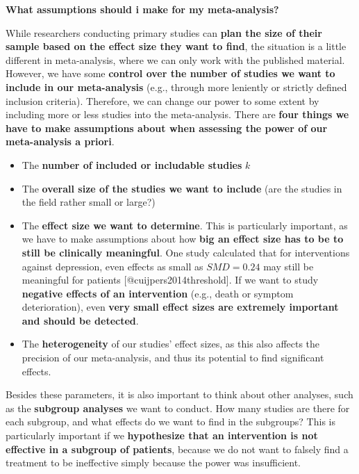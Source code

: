 \documentclass[]{book}
\providecommand{\tightlist}{%
  \setlength{\itemsep}{0pt}\setlength{\parskip}{0pt}}
\begin{document}
\begin{rmdinfo}
\textbf{What assumptions should i make for my meta-analysis?}

While researchers conducting primary studies can \textbf{plan the size
of their sample based on the effect size they want to find}, the
situation is a little different in meta-analysis, where we can only work
with the published material. However, we have some \textbf{control over
the number of studies we want to include in our meta-analysis} (e.g.,
through more leniently or strictly defined inclusion criteria).
Therefore, we can change our power to some extent by including more or
less studies into the meta-analysis. There are \textbf{four things we
have to make assumptions about when assessing the power of our
meta-analysis a priori}.

\begin{itemize}
\tightlist
\item
  The \textbf{number of included or includable studies} \(k\)
\item
  The \textbf{overall size of the studies we want to include} (are the
  studies in the field rather small or large?)
\item
  The \textbf{effect size we want to determine}. This is particularly
  important, as we have to make assumptions about how \textbf{big an
  effect size has to be to still be clinically meaningful}. One study
  calculated that for interventions against depression, even effects as
  small as \(SMD=0.24\) may still be meaningful for patients
  {[}@cuijpers2014threshold{]}. If we want to study \textbf{negative
  effects of an intervention} (e.g., death or symptom deterioration),
  even \textbf{very small effect sizes are extremely important and
  should be detected}.
\item
  The \textbf{heterogeneity} of our studies' effect sizes, as this also
  affects the precision of our meta-analysis, and thus its potential to
  find significant effects.
\end{itemize}

Besides these parameters, it is also important to think about other
analyses, such as the \textbf{subgroup analyses} we want to conduct. How
many studies are there for each subgroup, and what effects do we want to
find in the subgroups? This is particularly important if we
\textbf{hypothesize that an intervention is not effective in a subgroup
of patients}, because we do not want to falsely find a treatment to be
ineffective simply because the power was insufficient.
\end{rmdinfo}
\end{document}
